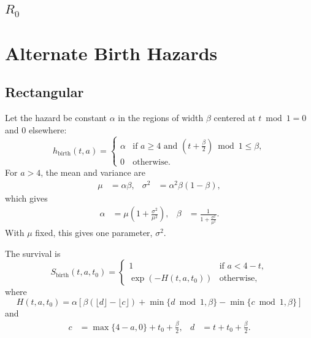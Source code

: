 \documentclass{jpmarticle}
\begin{document}
\subsection{$R_0$}


\appendix

\section{Alternate Birth Hazards}

\subsection{Rectangular}

Let the hazard be constant $\alpha$ in the regions of width $\beta$
centered at $t \bmod 1 = 0$ and $0$ elsewhere:
\begin{equation}
  h_{\text{birth}} (t, a) =
  \begin{cases}
    \alpha & \text{if $a \geq 4$ and $\left(t + \frac{\beta}{2}\right)
      \bmod 1 \leq \beta$},
    \\
    0 & \text{otherwise}.
  \end{cases}
\end{equation}
For $a > 4$, the mean and variance are
\begin{align}
  \mu &= \alpha \beta,
  &
  \sigma^2 &= \alpha^2 \beta (1 - \beta),
\end{align}
which gives
\begin{align}
  \alpha &= \mu \left(1 + \frac{\sigma^2}{\mu^2}\right),
  &
  \beta &= \frac{1}{1 + \frac{\sigma^2}{\mu^2}}.
\end{align}
With $\mu$ fixed, this gives one parameter, $\sigma^2$.

The survival is
\begin{equation}
  S_{\text{birth}}(t, a, t_0) =
  \begin{cases}
    1 & \text{if $a < 4 - t$},
    \\
    \exp\left(-H(t, a, t_0)\right)
    & \text{otherwise},
  \end{cases}
\end{equation}
where
\begin{equation}
  H(t, a, t_0) =
  \alpha \left[
    \beta (\lfloor d \rfloor - \lfloor c \rfloor)
    + \min\{d \bmod 1, \beta\}
    - \min\{c \bmod 1, \beta\}
  \right]
\end{equation}
and
\begin{align}
  c &= \max\{4 - a, 0\} + t_0 + \frac{\beta}{2},
  &
  d &= t + t_0 + \frac{\beta}{2}.
\end{align}
\end{document}
